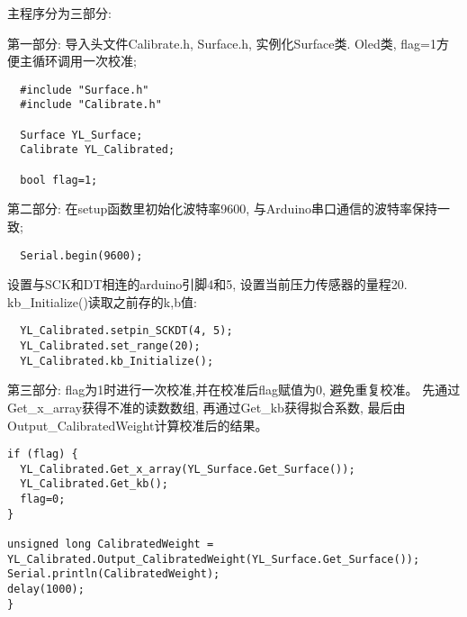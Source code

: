 \documentclass{article}
\begin{document}
主程序分为三部分:

\noindent 第一部分: 导入头文件Calibrate.h, Surface.h, 实例化Surface类. Oled类, flag=1方便主循环调用一次校准;
\begin{lstlisting}
  #include "Surface.h"
  #include "Calibrate.h"
  
  Surface YL_Surface;
  Calibrate YL_Calibrated;
  
  bool flag=1;
\end{lstlisting}  

\noindent 第二部分: 在setup函数里初始化波特率9600, 与Arduino串口通信的波特率保持一致; 
\begin{lstlisting}
  Serial.begin(9600);
\end{lstlisting}

设置与SCK和DT相连的arduino引脚4和5, 设置当前压力传感器的量程20. kb\_Initialize()读取之前存的k,b值:
\begin{lstlisting}
  YL_Calibrated.setpin_SCKDT(4, 5);
  YL_Calibrated.set_range(20);
  YL_Calibrated.kb_Initialize();
\end{lstlisting}

\noindent 第三部分: flag为1时进行一次校准,并在校准后flag赋值为0, 避免重复校准。 
先通过Get\_x\_array获得不准的读数数组, 再通过Get\_kb获得拟合系数, 最后由Output\_CalibratedWeight计算校准后的结果。
\begin{lstlisting}
if (flag) {
  YL_Calibrated.Get_x_array(YL_Surface.Get_Surface());
  YL_Calibrated.Get_kb();
  flag=0;
}

unsigned long CalibratedWeight = YL_Calibrated.Output_CalibratedWeight(YL_Surface.Get_Surface());
Serial.println(CalibratedWeight);
delay(1000);
}
\end{lstlisting}
\end{document}
